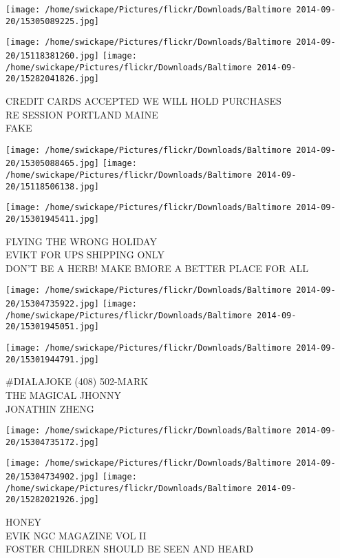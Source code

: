 \documentclass[10pt,letterpaper]{article}
\begin{document}
\texttt{[image: /home/swickape/Pictures/flickr/Downloads/Baltimore 2014-09-20/15305089225.jpg]}

\vspace{0.25in}
\texttt{[image: /home/swickape/Pictures/flickr/Downloads/Baltimore 2014-09-20/15118381260.jpg]}
\texttt{[image: /home/swickape/Pictures/flickr/Downloads/Baltimore 2014-09-20/15282041826.jpg]}

CREDIT CARDS ACCEPTED WE WILL HOLD PURCHASES\\
RE SESSION PORTLAND MAINE\\
FAKE
\pagebreak

\texttt{[image: /home/swickape/Pictures/flickr/Downloads/Baltimore 2014-09-20/15305088465.jpg]}
\texttt{[image: /home/swickape/Pictures/flickr/Downloads/Baltimore 2014-09-20/15118506138.jpg]}

\vspace{0.25in}
\texttt{[image: /home/swickape/Pictures/flickr/Downloads/Baltimore 2014-09-20/15301945411.jpg]}

FLYING THE WRONG HOLIDAY\\
EVIKT FOR UPS SHIPPING ONLY\\
DON'T BE A HERB!  MAKE BMORE A BETTER PLACE FOR ALL
\pagebreak

\texttt{[image: /home/swickape/Pictures/flickr/Downloads/Baltimore 2014-09-20/15304735922.jpg]}
\texttt{[image: /home/swickape/Pictures/flickr/Downloads/Baltimore 2014-09-20/15301945051.jpg]}

\vspace{0.25in}
\texttt{[image: /home/swickape/Pictures/flickr/Downloads/Baltimore 2014-09-20/15301944791.jpg]}

\#DIALAJOKE (408) 502{-}MARK\\
THE MAGICAL JHONNY\\
JONATHIN ZHENG
\pagebreak

\texttt{[image: /home/swickape/Pictures/flickr/Downloads/Baltimore 2014-09-20/15304735172.jpg]}

\vspace{0.25in}
\texttt{[image: /home/swickape/Pictures/flickr/Downloads/Baltimore 2014-09-20/15304734902.jpg]}
\texttt{[image: /home/swickape/Pictures/flickr/Downloads/Baltimore 2014-09-20/15282021926.jpg]}

HONEY\\
EVIK NGC MAGAZINE VOL II\\
FOSTER CHILDREN SHOULD BE SEEN AND HEARD
\pagebreak
\end{document}
